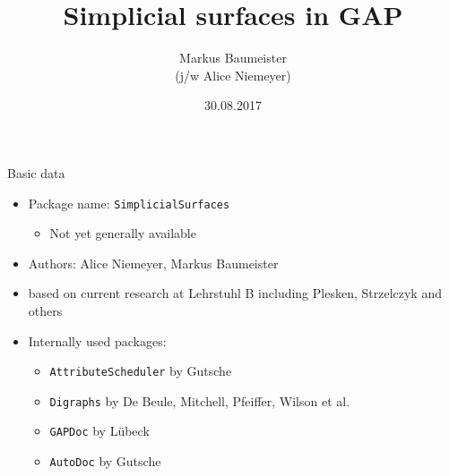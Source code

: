 \documentclass[11pt]{beamer}
\author[Baumeister]{Markus Baumeister\\ \vspace{1mm} \small{(j/w Alice Niemeyer)}}
\title{Simplicial surfaces in GAP}
\institute[Aachen]{Lehrstuhl B für Mathematik\\RWTH Aachen University}
\date{30.08.2017}
\begin{document}
\begin{frame}
\titlepage
\end{frame}

\begin{frame}{Basic data}
    \begin{itemize}
        \item Package name: \texttt{SimplicialSurfaces}
            \begin{itemize}
                \pause
                \item Not yet generally available
            \end{itemize}
        \pause
        \item Authors: Alice Niemeyer, Markus Baumeister
        \pause
        \item based on current research at Lehrstuhl B including Plesken, Strzelczyk and others
        \pause
        \item Internally used packages:
            \begin{itemize}
                \pause
                \item \texttt{AttributeScheduler} by Gutsche
                \pause
                \item \texttt{Digraphs} by De Beule, Mitchell, Pfeiffer, Wilson et al.
                \pause
                \item \texttt{GAPDoc} by Lübeck
                \pause
                \item \texttt{AutoDoc} by Gutsche
            \end{itemize}
    \end{itemize}
\end{frame}
\end{document}
